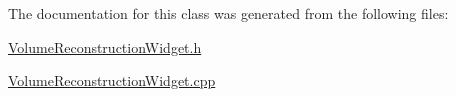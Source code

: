 The documentation for this class was generated from the following files\-:\begin{DoxyCompactItemize}
\item 
\hyperlink{_volume_reconstruction_widget_8h}{Volume\-Reconstruction\-Widget.\-h}\item 
\hyperlink{_volume_reconstruction_widget_8cpp}{Volume\-Reconstruction\-Widget.\-cpp}\end{DoxyCompactItemize}
